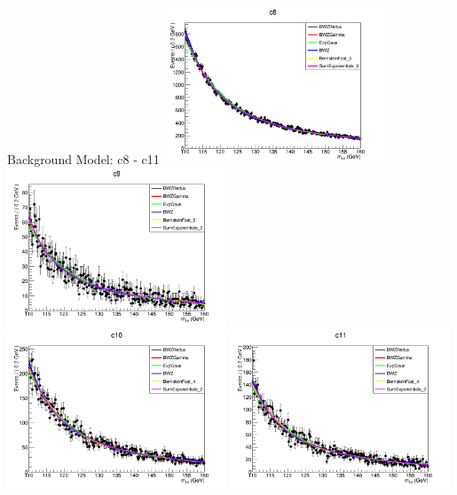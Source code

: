 \documentclass[pdf, 9pt]{beamer}
\begin{document}
  \begin{frame}{Background Model: c8 - c11}
    \includegraphics[width=0.49\textwidth, height=0.45\textheight]{figs/higgs/backgroundmodel/uf_bdt/backgroundFits__c8__bkgModels.png}
    \includegraphics[width=0.49\textwidth, height=0.45\textheight]{figs/higgs/backgroundmodel/uf_bdt/backgroundFits__c9__bkgModels.png}\\
    \includegraphics[width=0.49\textwidth, height=0.45\textheight]{figs/higgs/backgroundmodel/uf_bdt/backgroundFits__c10__bkgModels.png}
    \includegraphics[width=0.49\textwidth, height=0.45\textheight]{figs/higgs/backgroundmodel/uf_bdt/backgroundFits__c11__bkgModels.png}
  \end{frame}
\end{document}
